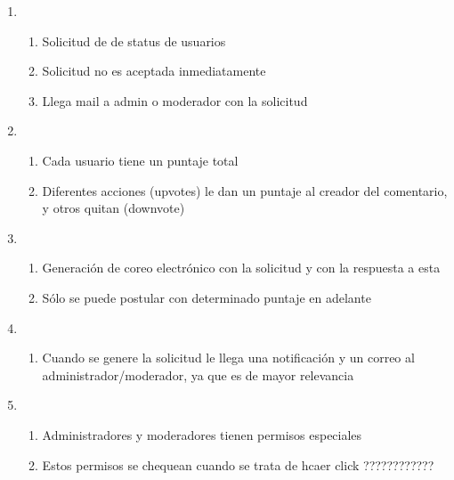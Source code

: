 \documentclass[12pt, letterpaper, notitlepage]{article}
\begin{document}
\begin{enumerate}
	\item {}
		\begin{enumerate}
			\item Solicitud de  de status de usuarios
			\item Solicitud no es aceptada inmediatamente
			\item Llega mail a admin o moderador con la solicitud
		\end{enumerate}
		
	\item {}
		\begin{enumerate}
			\item Cada usuario tiene un puntaje total
			\item Diferentes acciones (upvotes) le dan un puntaje al creador del comentario, y otros quitan (downvote)	
		\end{enumerate}
		
	\item {}
		\begin{enumerate}
			\item Generación de coreo electrónico con la solicitud y con la respuesta a esta
			\item Sólo se puede postular con determinado puntaje en adelante
		\end{enumerate}
		
	\item {}
		\begin{enumerate}
			\item Cuando se genere la solicitud le llega una notificación y un correo al administrador/moderador, ya que es de mayor relevancia
		\end{enumerate}
		
	\item {}
		\begin{enumerate}
			\item Administradores y moderadores tienen permisos especiales
			\item Estos permisos se chequean cuando se trata de hcaer click ????????????
		\end{enumerate}
	

\end{enumerate}
\end{document}
